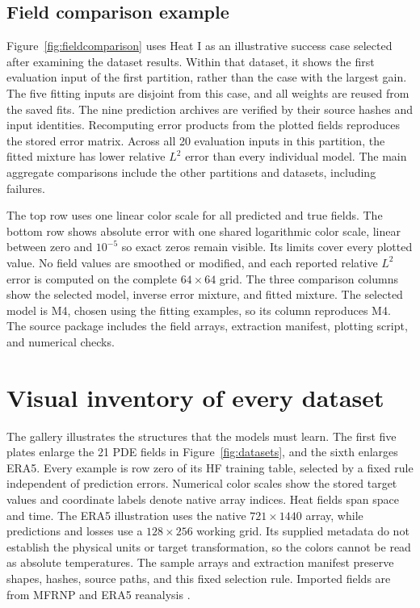 



\subsection{Field comparison example}
\label{app:fieldcomparison}
Figure~\ref{fig:fieldcomparison} uses Heat I as an illustrative success case
selected after examining the dataset results. Within that dataset, it shows
the first evaluation input of the first partition, rather than the case with
the largest gain. The five fitting inputs are disjoint from this case, and all
weights are reused from the saved fits. The nine prediction archives are
verified by their source hashes and input identities. Recomputing error
products from the plotted fields reproduces the stored error matrix.
Across all 20 evaluation inputs in this partition, the fitted mixture has
lower relative $L^2$ error than every individual model. The main aggregate
comparisons include the other partitions and datasets, including failures.

The top row uses one linear color scale for all predicted and true fields.
The bottom row shows absolute error with one shared logarithmic color scale,
linear between zero and $10^{-5}$ so exact zeros remain visible. Its limits
cover every plotted value. No field values are smoothed or modified, and each
reported relative $L^2$ error is computed on the complete $64\times64$ grid.
The three comparison columns show the selected model, inverse error mixture,
and fitted mixture. The selected model is M4, chosen using the fitting examples,
so its column reproduces M4. The source package includes
the field arrays, extraction manifest, plotting script, and numerical checks.

\clearpage
\section{Visual inventory of every dataset}
\label{app:gallery}
The gallery illustrates the structures that the models must learn.
The first five plates enlarge the 21 PDE fields in Figure~\ref{fig:datasets},
and the sixth enlarges ERA5. Every example is row zero of its HF training table,
selected by a fixed rule independent of prediction errors. Numerical color scales show the
stored target values and coordinate labels denote native array indices. Heat
fields span space and time. The ERA5 illustration uses the native
$721\times1440$ array, while predictions and losses use a $128\times256$ working
grid. Its supplied metadata do not establish the physical units or target
transformation, so the colors cannot be read as absolute temperatures. The
sample arrays and extraction manifest preserve shapes, hashes, source paths,
and this fixed selection rule. Imported fields are from MFRNP \citep{niu2024}
and ERA5 reanalysis \citep{hersbach2020}.

